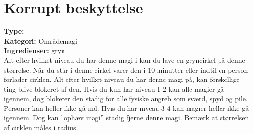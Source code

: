 \section*{Korrupt beskyttelse}
\textbf{Type:} - \\
\textbf{Kategori:} Områdemagi\\
\textbf{Ingredienser:} gryn\\
Alt efter hvilket niveau du har denne magi i kan du lave en gryncirkel på denne størrelse. Når du står i denne cirkel varer den i 10 minutter eller indtil en person forlader cirklen. Alt efter hvilket niveau du har denne magi på, kan forskellige ting blive blokeret af den. Hvis du kun har niveau 1-2 kan alle magier gå igennem, dog blokerer den stadig for alle fysiske angreb som sværd, spyd og pile. Personer kan heller ikke gå ind. Hvis du har niveau 3-4 kan magier heller ikke gå igennem. Dog kan ”ophæv magi” stadig fjerne denne magi. Bemærk at størrelsen af cirklen måles i radius.
